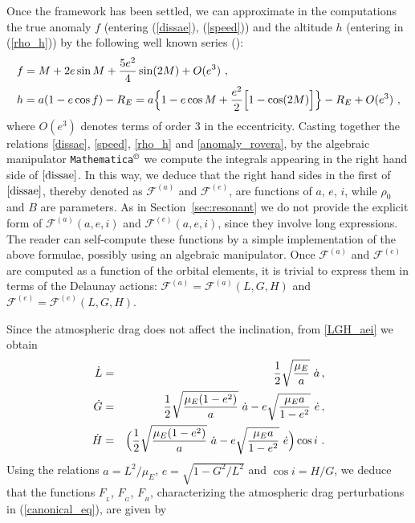 \documentclass[12pt,reqno]{amsart}
\numberwithin{equation}{section}
\newcommand{\beqano}{ \begin{eqnarray*} }
\newcommand{\eeqano}{ \end{eqnarray*} }
\newcommand\equ[1]{{\rm (\ref{#1})}}
\begin{document}
Once the framework has been settled, we can approximate in the
computations the true anomaly $f$ (entering \equ{dissae}, \equ{speed})
and the altitude $h$ (entering in \equ{rho_h}) by the following well known
series (\cite{Roy,Alebook}):
\begin{equation}\label{anomaly_rovera}
\begin{split}
& f = M+2e \sin M+\frac{5 e^2}{4}\sin(2M)+O(e^3)\ ,\\
& h=a(1-e \cos f)-R_E= a\Bigl\{1-e \cos M+\frac{e^2}{2}\Bigl[1- \cos(2M)\Bigr]\Bigr\}-R_E +O(e^3)\ ,
\end{split}
\end{equation}
where $O(e^3)$ denotes terms of order 3 in the eccentricity.
Casting together the relations \eqref{dissae}, \eqref{speed}, \eqref{rho_h}  and \eqref{anomaly_rovera}, by the algebraic manipulator \verb"Mathematica"$^\copyright$ we compute the integrals appearing in the right
hand side of $\eqref{dissae}$. In this way, we deduce that the right hand sides
in the first of $\eqref{dissae}$, thereby denoted as
$\mathcal{F}^{(a)}$ and $\mathcal{F}^{(e)}$, are functions of $a$, $e$, $i$, while $\rho_0$ and $B$ are parameters. As in Section~\ref{sec:resonant} we do not provide the explicit form of $\mathcal{F}^{(a)}(a,e,i)$ and $\mathcal{F}^{(e)}(a,e,i)$,
since they involve long expressions. The reader can self-compute these functions by a simple implementation of the above
formulae, possibly using an algebraic manipulator.
Once $\mathcal{F}^{(a)}$ and $\mathcal{F}^{(e)}$ are computed as a function of the orbital elements, it is
trivial to express them in terms of the Delaunay actions:
$\mathcal{F}^{(a)}=\mathcal{F}^{(a)}(L,G,H)$ and $\mathcal{F}^{(e)}=\mathcal{F}^{(e)}(L,G,H)$.

Since the atmospheric drag does not affect the inclination, from \eqref{LGH_aei} we obtain
\beqano
\dot L&=&{{1}\over {2}} \sqrt{\frac{\mu_E}{a}}\ \dot a\,,\nonumber\\
\dot G&=&{{1}\over {2}} \sqrt{\frac{\mu_E (1-e^2)}{a}}\ \dot a-e \sqrt{{{ \mu_E a}\over {1-e^2}}} \ \dot e\,,\nonumber\\
\dot H&=&\Bigl({{1}\over {2}} \sqrt{\frac{\mu_E (1-e^2)}{a}}\ \dot a-e \sqrt{{{ \mu_E a}\over {1-e^2}}} \ \dot e \Bigr)
\cos i \ .\nonumber\\
\eeqano
Using the relations $a=L^2/\mu_E$, $e=\sqrt{1-G^2/L^2}$ and $\cos i=H/G$, we deduce that the functions $F_{_L}$, $F_{_G}$, $F_{_H}$, characterizing the atmospheric drag perturbations
in \equ{canonical_eq}, are given by
\end{document}
